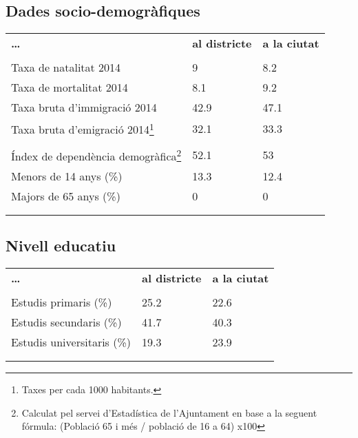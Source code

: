 \documentclass[]{article}
\begin{document}
\subsection{Dades socio-demogràfiques}\label{dades-socio-demografiques}

\begin{longtable}[c]{@{}lll@{}}
\toprule\addlinespace
\textbf{\ldots{}} & \textbf{al districte} & \textbf{a la ciutat}
\\\addlinespace
\midrule\endhead
\\\addlinespace
Taxa de natalitat 2014 & 9 & 8.2
\\\addlinespace
Taxa de mortalitat 2014 & 8.1 & 9.2
\\\addlinespace
Taxa bruta d'immigració 2014 & 42.9 & 47.1
\\\addlinespace
Taxa bruta d'emigració 2014\footnote{Taxes per cada 1000 habitants.} &
32.1 & 33.3
\\\addlinespace
\\\addlinespace
Índex de dependència demogràfica\footnote{Calculat pel servei
  d'Estadística de l'Ajuntament en base a la seguent fórmula: (Població
  65 i més / població de 16 a 64) x100} & 52.1 & 53
\\\addlinespace
Menors de 14 anys (\%) & 13.3 & 12.4
\\\addlinespace
Majors de 65 anys (\%) & 0 & 0
\\\addlinespace
\\\addlinespace
\bottomrule
\end{longtable}

\subsection{Nivell educatiu}\label{nivell-educatiu}

\begin{longtable}[c]{@{}lll@{}}
\toprule\addlinespace
\textbf{\ldots{}} & \textbf{al districte} & \textbf{a la ciutat}
\\\addlinespace
\midrule\endhead
\\\addlinespace
Estudis primaris (\%) & 25.2 & 22.6
\\\addlinespace
Estudis secundaris (\%) & 41.7 & 40.3
\\\addlinespace
Estudis universitaris (\%) & 19.3 & 23.9
\\\addlinespace
\\\addlinespace
\bottomrule
\end{longtable}
\end{document}
